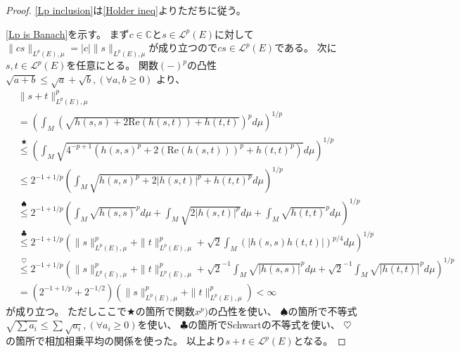 \documentclass[uplatex]{jsarticle}
\theoremstyle{definition}
\renewcommand{\Re}{\mathrm{Re}}
\newcommand{\C}{\mathbb{C}}
\newcommand{\mcL}{\mathcal{L}}
\begin{document}
\begin{proof}
  \ref{Lp inclusion}は\ref{Holder ineq}よりただちに従う。

  \ref{Lp is Banach}を示す。
  まず\(c \in \C\)と\(s\in \mcL^p(E)\)に対して
  \(\|cs\|_{L^p(E),\mu} = |c|\|s\|_{L^p(E),\mu}\)が成り立つので\(cs\in \mcL^p(E)\)である。
  次に\(s,t\in \mcL^p(E)\)を任意にとる。
  関数\((-)^p\)の凸性
  \(\sqrt{a+b} \leq \sqrt{a}+\sqrt{b}, (\forall a,b\geq 0)\)
  より、
  \begin{align*}
    &\|s+t\|_{L^p(E),\mu}^p \\
    &= \left(\int_M (\sqrt{h(s,s) + 2\Re(h(s,t)) + h(t,t)})^p d\mu\right)^{1/p} \\
    &\overset{\bigstar}{\leq}
    \left(\int_M \sqrt{4^{-p+1}(h(s,s)^p + 2(\Re(h(s,t)))^p + h(t,t)^p)} d\mu \right)^{1/p} \\
    &\leq
    2^{-1+1/p}\left(\int_M \sqrt{h(s,s)^p + 2|h(s,t)|^p + h(t,t)^p} d\mu \right)^{1/p} \\
    &\overset{\spadesuit}{\leq}
    2^{-1+1/p}\left(\int_M \sqrt{h(s,s)}^p d\mu + \int_M \sqrt{2|h(s,t)|^p} d\mu
    + \int_M \sqrt{h(t,t)}^p d\mu \right)^{1/p} \\
    &\overset{\clubsuit}{\leq}
    2^{-1+1/p}\left( \|s\|_{L^p(E),\mu}^p + \|t\|_{L^p(E),\mu}^p +
    \sqrt{2}\int_M (|h(s,s)h(t,t)|)^{p/4} d\mu \right)^{1/p} \\
    &\overset{\heartsuit}{\leq}
    2^{-1+1/p}\left( \|s\|_{L^p(E),\mu}^p + \|t\|_{L^p(E),\mu}^p +
    \sqrt{2}^{-1}\int_M \sqrt{|h(s,s)|}^pd\mu
    + \sqrt{2}^{-1}\int_M \sqrt{|h(t,t)|}^pd\mu \right)^{1/p} \\
    &= (2^{-1+1/p}+2^{-1/2}) \left( \|s\|_{L^p(E),\mu}^p + \|t\|_{L^p(E),\mu}^p\right) < \infty
  \end{align*}
  が成り立つ。
  ただしここで\(\bigstar\)の箇所で関数\(x^p)\)の凸性を使い、
  \(\spadesuit\)の箇所で不等式\(\sqrt{\sum a_i} \leq \sum \sqrt{a_i},(\forall a_i \geq 0)\)を使い、
  \(\clubsuit\)の箇所でSchwartの不等式を使い、
  \(\heartsuit\)の箇所で相加相乗平均の関係を使った。
  以上より\(s+t\in \mcL^p(E)\)となる。


\end{proof}
\end{document}
